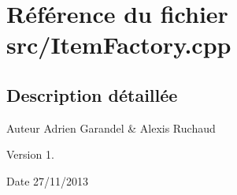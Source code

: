 \section{Référence du fichier src/\-Item\-Factory.cpp}
\label{_item_factory_8cpp}


\subsection{Description détaillée}
\begin{DoxyAuthor}{Auteur}
Adrien Garandel \& Alexis Ruchaud 
\end{DoxyAuthor}
\begin{DoxyVersion}{Version}
1. 
\end{DoxyVersion}
\begin{DoxyDate}{Date}
27/11/2013 
\end{DoxyDate}
